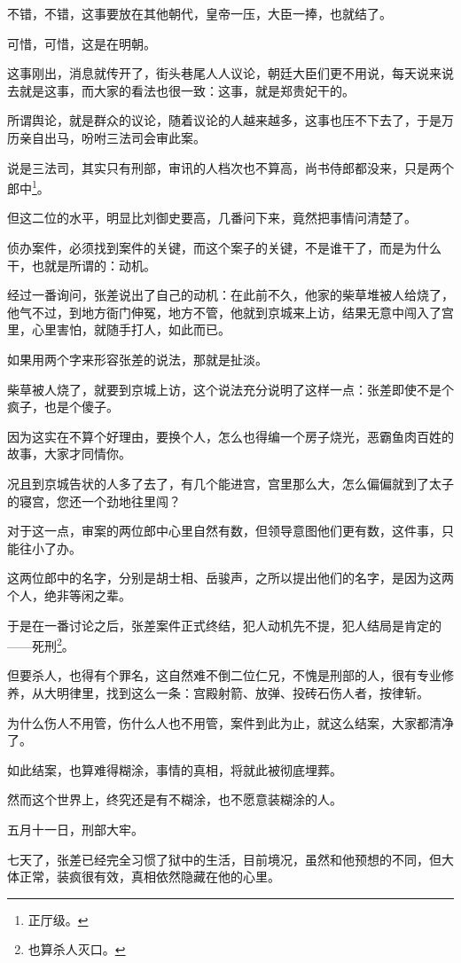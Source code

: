 \begin{multicols}{\theparacolNo}
不错，不错，这事要放在其他朝代，皇帝一压，大臣一捧，也就结了。

可惜，可惜，这是在明朝。

这事刚出，消息就传开了，街头巷尾人人议论，朝廷大臣们更不用说，每天说来说去就是这事，而大家的看法也很一致：这事，就是郑贵妃干的。

所谓舆论，就是群众的议论，随着议论的人越来越多，这事也压不下去了，于是万历亲自出马，吩咐三法司会审此案。

说是三法司，其实只有刑部，审讯的人档次也不算高，尚书侍郎都没来，只是两个郎中\footnote{正厅级。}。

但这二位的水平，明显比刘御史要高，几番问下来，竟然把事情问清楚了。

侦办案件，必须找到案件的关键，而这个案子的关键，不是谁干了，而是为什么干，也就是所谓的：动机。

经过一番询问，张差说出了自己的动机：在此前不久，他家的柴草堆被人给烧了，他气不过，到地方衙门伸冤，地方不管，他就到京城来上访，结果无意中闯入了宫里，心里害怕，就随手打人，如此而已。

如果用两个字来形容张差的说法，那就是扯淡。

柴草被人烧了，就要到京城上访，这个说法充分说明了这样一点：张差即使不是个疯子，也是个傻子。

因为这实在不算个好理由，要换个人，怎么也得编一个房子烧光，恶霸鱼肉百姓的故事，大家才同情你。

况且到京城告状的人多了去了，有几个能进宫，宫里那么大，怎么偏偏就到了太子的寝宫，您还一个劲地往里闯？

对于这一点，审案的两位郎中心里自然有数，但领导意图他们更有数，这件事，只能往小了办。

这两位郎中的名字，分别是胡士相、岳骏声，之所以提出他们的名字，是因为这两个人，绝非等闲之辈。

于是在一番讨论之后，张差案件正式终结，犯人动机先不提，犯人结局是肯定的——死刑\footnote{也算杀人灭口。}。

但要杀人，也得有个罪名，这自然难不倒二位仁兄，不愧是刑部的人，很有专业修养，从大明律里，找到这么一条：宫殿射箭、放弹、投砖石伤人者，按律斩。

为什么伤人不用管，伤什么人也不用管，案件到此为止，就这么结案，大家都清净了。

如此结案，也算难得糊涂，事情的真相，将就此被彻底埋葬。

然而这个世界上，终究还是有不糊涂，也不愿意装糊涂的人。

五月十一日，刑部大牢。

七天了，张差已经完全习惯了狱中的生活，目前境况，虽然和他预想的不同，但大体正常，装疯很有效，真相依然隐藏在他的心里。


\end{multicols}
